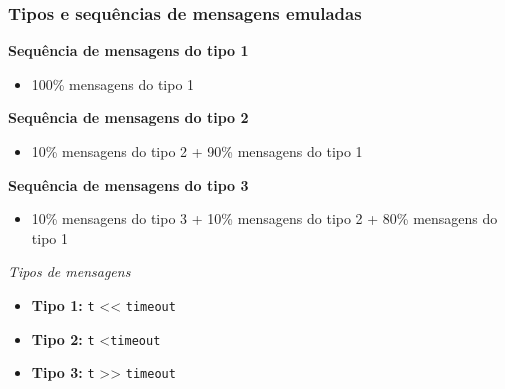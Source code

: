 \begin{frame}
    \frametitle{Tipos e sequências de mensagens emuladas}
    \textbf{Sequência de mensagens do tipo 1}
    \begin{itemize}
      \item 100\% mensagens do tipo 1
    \end{itemize}  
    \textbf{Sequência de mensagens do tipo 2}
    \begin{itemize}
      \item 10\% mensagens do tipo 2 + 90\% mensagens do tipo 1
    \end{itemize}  
    \textbf{Sequência de mensagens do tipo 3}
    \begin{itemize}
      \item 10\% mensagens do tipo 3 + 10\% mensagens do tipo 2 + 80\% mensagens do tipo 1
    \end{itemize}
    \textit{Tipos de mensagens}
    \begin{itemize}
      \item \textbf{Tipo 1:} \texttt{t} << \texttt{timeout}
      \item \textbf{Tipo 2:} \texttt{t} \textless  \texttt{timeout}
      \item \textbf{Tipo 3:} \texttt{t} >> \texttt{timeout}
    \end{itemize}  
\end{frame}    
